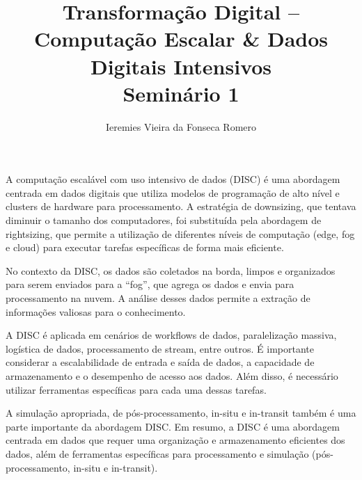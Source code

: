 \documentclass[11pt]{article}
\author{Ieremies Vieira da Fonseca Romero}
\date{}
\title{Transformação Digital – Computação Escalar \& Dados Digitais Intensivos\\\medskip
\large Seminário 1}
\begin{document}
\maketitle
A computação escalável com uso intensivo de dados (DISC) é uma abordagem centrada em dados digitais que utiliza modelos de programação de alto nível e clusters de hardware para processamento. A estratégia de downsizing, que tentava diminuir o tamanho dos computadores, foi substituída pela abordagem de rightsizing, que permite a utilização de diferentes níveis de computação (edge, fog e cloud) para executar tarefas específicas de forma mais eficiente.

No contexto da DISC, os dados são coletados na borda, limpos e organizados para serem enviados para a “fog”, que agrega os dados e envia para processamento na nuvem. A análise desses dados permite a extração de informações valiosas para o conhecimento.

A DISC é aplicada em cenários de workflows de dados, paralelização massiva, logística de dados, processamento de stream, entre outros. É importante considerar a escalabilidade de entrada e saída de dados, a capacidade de armazenamento e o desempenho de acesso aos dados. Além disso, é necessário utilizar ferramentas específicas para cada uma dessas tarefas.

A simulação apropriada, de pós-processamento, in-situ e in-transit também é uma parte importante da abordagem DISC. Em resumo, a DISC é uma abordagem centrada em dados que requer uma organização e armazenamento eficientes dos dados, além de ferramentas específicas para processamento e simulação (pós-processamento, in-situ e in-transit).
\end{document}
